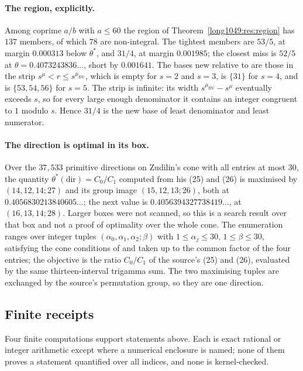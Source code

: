 \documentclass[11pt]{article}
\begin{document}
\paragraph{The region, explicitly.}
Among coprime $a/b$ with $a\le60$ the region of Theorem~\ref{long1049:res:region} has
$137$ members, of which $78$ are non-integral.  The tightest members are $53/5$,
at margin $0.000313$ below $\theta^{*}$, and $31/4$, at margin $0.001985$; the
closest miss is $52/5$ at $\theta=0.4073243836\ldots$, short by $0.001641$.  The
bases new relative to \cite{bv1994} are those in the strip
$s^{\mu}<r\le s^{\mu_{\mathrm{BV}}}$, which is empty for $s=2$ and $s=3$, is
$\{31\}$ for $s=4$, and is $\{53,54,56\}$ for $s=5$.  The strip is infinite:
its width $s^{\mu_{\mathrm{BV}}}-s^{\mu}$ eventually exceeds $s$, so for every
large enough denominator it contains an integer congruent to $1$ modulo $s$.
Hence $31/4$ is the new base of least denominator and least numerator.

\paragraph{The direction is optimal in its box.}
Over the $37{,}533$ primitive directions on Zudilin's cone with all entries at
most $30$, the quantity $\theta^{*}(\mathrm{dir})=C_0/C_1$ computed from his
(25) and (26) is maximised by $(14,12,14;27)$ and its group image
$(15,12,13;26)$, both at $0.4056830213840605\ldots$; the next value is
$0.4056394327738419\ldots$, at $(16,13,14;28)$.  Larger boxes were not scanned,
so this is a search result over that box and not a proof of optimality over the
whole cone.  The enumeration ranges over integer tuples
$(\alpha_0,\alpha_1,\alpha_2;\beta)$ with $1\le\alpha_j\le30$,
$1\le\beta\le30$, satisfying the cone conditions of \cite[Sec.~5]{zudilin2004}
and taken up to the common factor of the four entries; the objective is the
ratio $C_0/C_1$ of the source's (25) and (26), evaluated by the same
thirteen-interval trigamma sum.  The two maximising tuples are exchanged by the
source's permutation group, so they are one direction.

\subsection{Finite receipts}\label{long1049:sec:receipts}

Four finite computations support statements above.  Each is exact rational or
integer arithmetic except where a numerical enclosure is named; none of them
proves a statement quantified over all indices, and none is kernel-checked.
\end{document}
